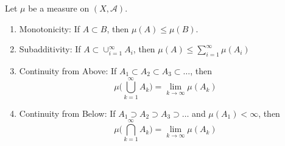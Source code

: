 \documentclass{article}
\begin{document}
    \begin{theorem}
      Let $\mu$ be a measure on $(X, \mathcal{A})$. 
      \begin{enumerate}
        \item Monotonicity: If $A \subset B$, then $\mu(A) \leq \mu(B)$. 
        \item Subadditivity: If $A \subset \cup_{i=1}^\infty A_i$, then $\mu(A) \leq \sum_{i=1}^\infty \mu (A_i)$ 
        \item Continuity from Above: If $A_1 \subset A_2 \subset A_3 \subset \ldots$, then 
        \begin{equation}
          \mu\bigg( \bigcup_{k=1}^\infty A_k \bigg) = \lim_{k \rightarrow \infty} \mu(A_k)
        \end{equation}
        \item Continuity from Below: If $A_1 \supset A_2 \supset A_3 \supset \ldots$ and $\mu(A_1) < \infty$, then 
        \begin{equation}
          \mu\bigg( \bigcap_{k=1}^\infty A_k \bigg) = \lim_{k \rightarrow \infty} \mu(A_k)
        \end{equation}
      \end{enumerate}
    \end{theorem}
\end{document}
